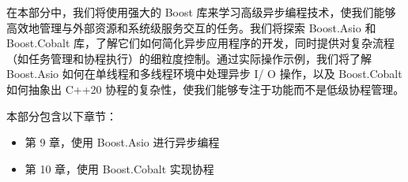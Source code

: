 在本部分中，我们将使用强大的 Boost 库来学习高级异步编程技术，使我们能够高效地管理与外部资源和系统级服务交互的任务。我们将探索 Boost.Asio 和 Boost.Cobalt 库，了解它们如何简化异步应用程序的开发，同时提供对复杂流程（如任务管理和协程执行）的细粒度控制。通过实际操作示例，我们将了解 Boost.Asio 如何在单线程和多线程环境中处理异步 I/ O 操作，以及 Boost.Cobalt 如何抽象出 C++20 协程的复杂性，使我们能够专注于功能而不是低级协程管理。

本部分包含以下章节：

\begin{itemize}
\item
第 9 章，使用 Boost.Asio 进行异步编程

\item
第 10 章，使用 Boost.Cobalt 实现协程
\end{itemize}